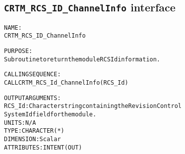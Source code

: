 \subsection{\texttt{CRTM\_RCS\_ID\_ChannelInfo} interface}
  \label{sec:CRTM_RCS_ID_ChannelInfo_interface}
  \begin{alltt}
 
  NAME:
        CRTM_RCS_ID_ChannelInfo
 
  PURPOSE:
        Subroutine to return the module RCS Id information.
 
  CALLING SEQUENCE:
        CALL CRTM_RCS_Id_ChannelInfo( RCS_Id )
 
  OUTPUT ARGUMENTS:
        RCS_Id:        Character string containing the Revision Control
                       System Id field for the module.
                       UNITS:      N/A
                       TYPE:       CHARACTER(*)
                       DIMENSION:  Scalar
                       ATTRIBUTES: INTENT(OUT)
 
  \end{alltt}

